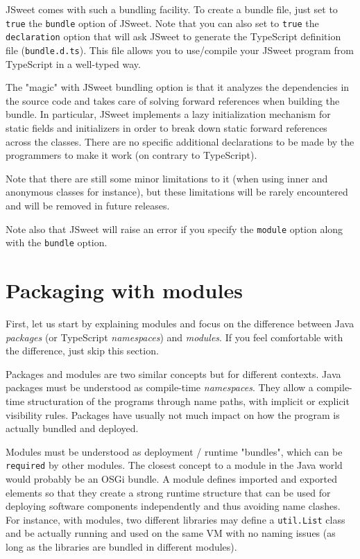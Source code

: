 \documentclass[a4paper]{report}
\begin{document}
JSweet comes with such a bundling facility. To create a bundle file, just set to \texttt{true} the \texttt{bundle} option of JSweet. Note that you can also set to \texttt{true} the \texttt{declaration} option that will ask JSweet to generate the TypeScript definition file (\texttt{bundle.d.ts}). This file allows you to use/compile your JSweet program from TypeScript in a well-typed way. 

The "magic" with JSweet bundling option is that it analyzes the dependencies in the source code and takes care of solving forward references when building the bundle. In particular, JSweet implements a lazy initialization mechanism for static fields and initializers in order to break down static forward references across the classes. There are no specific additional declarations to be made by the programmers to make it work (on contrary to TypeScript). 

Note that there are still some minor limitations to it (when using inner and anonymous classes for instance), but these limitations will be rarely encountered and will be removed in future releases.

Note also that JSweet will raise an error if you specify the \texttt{module} option along with the \texttt{bundle} option.

\section{Packaging with modules}

First, let us start by explaining modules and focus on the difference between Java \emph{packages} (or TypeScript \emph{namespaces}) and \emph{modules}. If you feel comfortable with the difference, just skip this section.

Packages and modules are two similar concepts but for different contexts. Java packages must be understood as compile-time \emph{namespaces}. They allow a compile-time structuration of the programs through name paths, with implicit or explicit visibility rules. Packages have usually not much impact on how the program is actually bundled and deployed.

Modules must be understood as deployment / runtime "bundles", which can be \texttt{required} by other modules. The closest concept to a module in the Java world would probably be an OSGi bundle. A module defines imported and exported elements so that they create a strong runtime structure that can be used for deploying software components independently and thus avoiding name clashes. For instance, with modules, two different libraries may define a \texttt{util.List} class and be actually running and used on the same VM with no naming issues (as long as the libraries are bundled in different modules).
\end{document}
